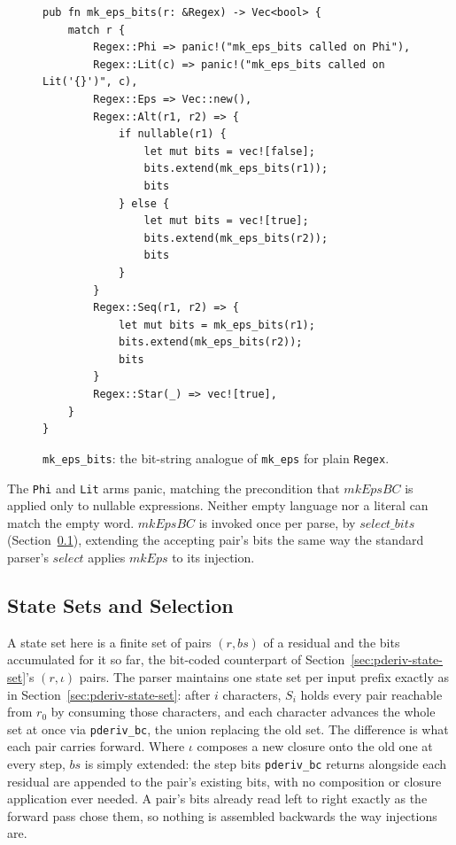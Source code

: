 \begin{figure}[H]
\small
\begin{verbatim}
pub fn mk_eps_bits(r: &Regex) -> Vec<bool> {
    match r {
        Regex::Phi => panic!("mk_eps_bits called on Phi"),
        Regex::Lit(c) => panic!("mk_eps_bits called on Lit('{}')", c),
        Regex::Eps => Vec::new(),
        Regex::Alt(r1, r2) => {
            if nullable(r1) {
                let mut bits = vec![false];
                bits.extend(mk_eps_bits(r1));
                bits
            } else {
                let mut bits = vec![true];
                bits.extend(mk_eps_bits(r2));
                bits
            }
        }
        Regex::Seq(r1, r2) => {
            let mut bits = mk_eps_bits(r1);
            bits.extend(mk_eps_bits(r2));
            bits
        }
        Regex::Star(_) => vec![true],
    }
}
\end{verbatim}
\caption{\texttt{mk\_eps\_bits}: the bit-string analogue of \texttt{mk\_eps}
for plain \texttt{Regex}.}
\label{fig:mk-eps-bits-rust}
\end{figure}

The \texttt{Phi} and \texttt{Lit} arms panic, matching the precondition that
$\mathit{mkEpsBC}$ is applied only to nullable expressions. Neither empty
language nor a literal can match the empty word.
$\mathit{mkEpsBC}$ is invoked once per parse, by $\mathit{select\_bits}$
(Section~\ref{sec:pderiv-bc-state-set}), extending the accepting
pair's bits the same way the standard parser's $\mathit{select}$
applies $\mathit{mkEps}$ to its injection.

%
%
%

\subsection{State Sets and Selection}
\label{sec:pderiv-bc-state-set}

A state set here is a finite set of pairs $(r, bs)$ of a residual and
the bits accumulated for it so far, the bit-coded counterpart of
Section~\ref{sec:pderiv-state-set}'s $(r, \iota)$ pairs.
The parser maintains one state set per input prefix exactly as in
Section~\ref{sec:pderiv-state-set}: after $i$ characters, $S_i$ holds
every pair reachable from $r_0$ by consuming those characters, and each
character advances the whole set at once via \texttt{pderiv\_bc}, the
union replacing the old set.
The difference is what each pair carries forward.
Where $\iota$ composes a new closure onto the old one at every step,
$bs$ is simply extended: the step bits \texttt{pderiv\_bc} returns
alongside each residual are appended to the pair's existing bits, with
no composition or closure application ever needed.
A pair's bits already read left to right exactly as the forward pass
chose them, so nothing is assembled backwards the way injections are.

